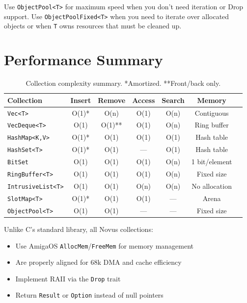 \begin{notebox}
Use \texttt{ObjectPool<T>} for maximum speed when you don't need iteration or Drop support. Use \texttt{ObjectPoolFixed<T>} when you need to iterate over allocated objects or when \texttt{T} owns resources that must be cleaned up.
\end{notebox}

\section{Performance Summary}
\label{sec:collection-performance}

\begin{table}[h]
\centering
\small
\begin{tabular}{lcccccc}
\textbf{Collection} & \textbf{Insert} & \textbf{Remove} & \textbf{Access} & \textbf{Search} & \textbf{Memory} \\
\hline
\texttt{Vec<T>} & O(1)* & O(n) & O(1) & O(n) & Contiguous \\
\texttt{VecDeque<T>} & O(1) & O(1)** & O(1) & O(n) & Ring buffer \\
\texttt{HashMap<K,V>} & O(1)* & O(1) & O(1) & O(1) & Hash table \\
\texttt{HashSet<T>} & O(1)* & O(1) & --- & O(1) & Hash table \\
\texttt{BitSet} & O(1) & O(1) & O(1) & O(n) & 1 bit/element \\
\texttt{RingBuffer<T>} & O(1) & O(1) & O(1) & O(n) & Fixed size \\
\texttt{IntrusiveList<T>} & O(1) & O(1) & O(n) & O(n) & No allocation \\
\texttt{SlotMap<T>} & O(1)* & O(1) & O(1) & --- & Arena \\
\texttt{ObjectPool<T>} & O(1) & O(1) & --- & --- & Fixed size \\
\end{tabular}
\caption{Collection complexity summary. *Amortized. **Front/back only.}
\end{table}

\begin{comingfromc}
Unlike C's standard library, all Novus collections:
\begin{itemize}
    \item Use AmigaOS \texttt{AllocMem}/\texttt{FreeMem} for memory management
    \item Are properly aligned for 68k DMA and cache efficiency
    \item Implement RAII via the \texttt{Drop} trait
    \item Return \texttt{Result} or \texttt{Option} instead of null pointers
\end{itemize}
\end{comingfromc}
